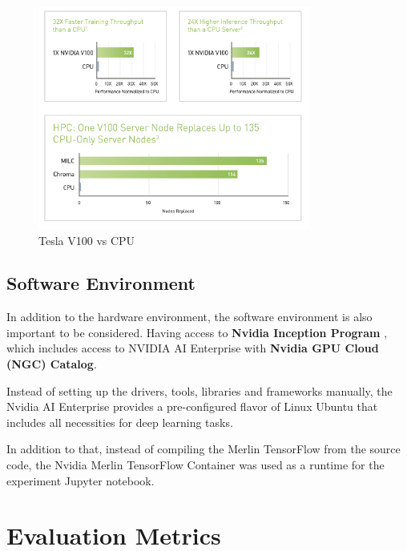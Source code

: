 \begin{figure}[H]
    \centering
    \includegraphics[width=0.8\textwidth]{assets/v100-vs-cpu.png}
    \caption[Tesla V100 vs CPU]{Tesla V100 vs CPU \cite{NvidiaV100DataSheet}}
    \label{fig:V100vsCPU}
\end{figure}

\subsection{Software Environment}

In addition to the hardware environment, the software environment is also important to be considered.
Having access to \textbf{Nvidia Inception Program} \cite{NvidiaStartups}, 
which includes access to NVIDIA AI Enterprise \cite{NvidiaAiEnterprise} with \textbf{Nvidia GPU Cloud (NGC) Catalog}\cite{NvidiaNGC}.

Instead of setting up the drivers, tools, libraries and frameworks manually, 
the Nvidia AI Enterprise provides a pre-configured flavor of Linux Ubuntu that includes all necessities for deep learning tasks.

In addition to that, instead of compiling the Merlin TensorFlow from the source code, 
the Nvidia Merlin TensorFlow Container \cite{NvidiaMerlinTf} was used as a runtime for the experiment Jupyter notebook.



\section{Evaluation Metrics}